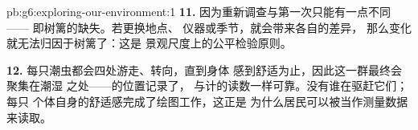 \begin{solution}{pb:g6:exploring-our-environment:1}
\textbf{11.} 因为重新调查与第一次只能有一点不同——
即树篱的缺失。若更换地点、
仪器或季节，就会带来各自的差异，
那么变化就无法归因于树篱了：这是
景观尺度上的公平检验原则。

\textbf{12.} 每只潮虫都会四处游走、转向，直到身体
感到舒适为止，因此这一群最终会聚集在潮湿
之处——的位置记录了，
与计的读数一样可靠。没有谁在驱赶它们；每只
个体自身的舒适感完成了绘图工作，这正是
为什么居民可以被当作测量数据来读取。
\end{solution}
